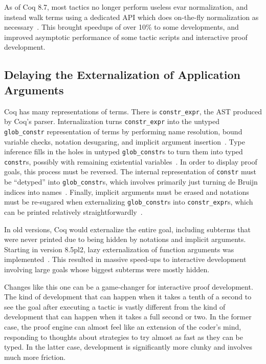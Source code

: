 As of Coq 8.7, most tactics no longer perform useless evar normalization, and instead walk terms using a dedicated API which does on-the-fly normalization as necessary~\cite{coq-pr-econstr}.
This brought speedups of over 10\% to some developments, and improved asymptotic performance of some tactic scripts and interactive proof development.

\subsection{Delaying the Externalization of Application Arguments}\label{sec:delayed-externalization}
Coq has many representations of terms.
There is \texttt{constr\_expr}, the AST produced by Coq's parser.
Internalization turns \texttt{constr\_expr} into the untyped \texttt{glob\_constr} representation of terms by performing name resolution, bound variable checks, notation desugaring, and implicit argument insertion~\cite{Constrintern}.
Type inference fills in the holes in untyped \texttt{glob\_constr}s to turn them into typed \texttt{constr}s, possibly with remaining existential variables~\cite{Pretyping}.
In order to display proof goals, this process must be reversed.
The internal representation of \texttt{constr} must be ``detyped'' into \texttt{glob\_constr}s, which involves primarily just turning de Bruijn indices into names~\cite{Detyping}.
Finally, implicit arguments must be erased and notations must be re-sugared when externalizing \texttt{glob\_constr}s into \texttt{constr\_expr}s, which can be printed relatively straightforwardly~\cite{Constrextern,Ppconstr}.

In old versions, Coq would externalize the entire goal, including subterms that were never printed due to being hidden by notations and implicit arguments.
Starting in version 8.5pl2, lazy externalization of function arguments was implemented~\cite{coq-commit-delayed-externalization}.
This resulted in massive speed-ups to interactive development involving large goals whose biggest subterms were mostly hidden.

Changes like this one can be a game-changer for interactive proof development.
The kind of development that can happen when it takes a tenth of a second to see the goal after executing a tactic is vastly different from the kind of development that can happen when it takes a full second or two.
In the former case, the proof engine can almost feel like an extension of the coder's mind, responding to thoughts about strategies to try almost as fast as they can be typed.
In the latter case, development is significantly more clunky and involves much more friction.

